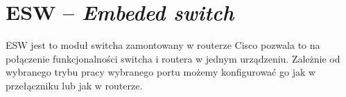 \chapter{ESW -- \textit{Embeded switch}}

ESW jest to moduł switcha zamontowany w routerze Cisco pozwala to na połączenie funkcjonalności switcha i routera w jednym urządzeniu. Zależnie od wybranego trybu pracy wybranego portu możemy konfigurować go jak w przełączniku lub jak w routerze.

